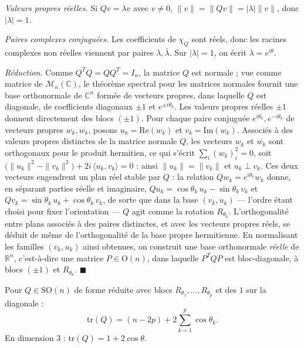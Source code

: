 \begin{mdframed}[style=proofbar]
  \textit{Valeurs propres réelles.} Si $Qv=\lambda v$ avec $v\neq 0$,
  $\|v\|=\|Qv\|=|\lambda|\|v\|$, donc $|\lambda|=1$.

  \textit{Paires complexes conjuguées.} Les coefficients de $\chi_Q$ sont réels,
  donc les racines complexes non réelles viennent par paires $\lambda,\bar\lambda$.
  Sur $|\lambda|=1$, on écrit $\lambda=e^{i\theta}$.

  \textit{Réduction.} Comme $Q^TQ=QQ^T=I_n$, la matrice $Q$ est normale ;
  vue comme matrice de $\mathcal{M}_n(\mathbb{C})$, le théorème spectral pour les
  matrices normales fournit une base orthonormale de $\mathbb{C}^n$ formée de vecteurs
  propres, dans laquelle $Q$ est diagonale, de coefficients diagonaux $\pm 1$ et
  $e^{\pm i\theta_k}$. Les valeurs propres réelles $\pm 1$ donnent directement des
  blocs $(\pm 1)$. Pour chaque paire conjuguée $e^{i\theta_k},e^{-i\theta_k}$ de
  vecteurs propres $w_k,\overline{w_k}$, posons $u_k=\mathrm{Re}(w_k)$ et
  $v_k=\mathrm{Im}(w_k)$. Associés à des valeurs propres distinctes de la matrice
  normale $Q$, les vecteurs $w_k$ et $\overline{w_k}$ sont orthogonaux pour le
  produit hermitien, ce qui s'écrit $\sum_i {(w_k)}_i^2 = 0$, soit
  $\bigl(\|u_k\|^2-\|v_k\|^2\bigr) + 2i\,\langle u_k,v_k\rangle = 0$ : ainsi
  $\|u_k\| = \|v_k\|$ et $u_k \perp v_k$. Ces deux vecteurs engendrent un plan réel
  stable par $Q$ : la relation $Qw_k = e^{i\theta_k}w_k$ donne, en séparant parties
  réelle et imaginaire, $Qu_k = \cos\theta_k\,u_k - \sin\theta_k\,v_k$ et
  $Qv_k = \sin\theta_k\,u_k + \cos\theta_k\,v_k$, de sorte que dans la base
  $(v_k,u_k)$ — l'ordre étant choisi pour fixer l'orientation — $Q$ agit comme la
  rotation $R_{\theta_k}$. L'orthogonalité entre plans associés à des paires
  distinctes, et avec les vecteurs propres réels, se déduit de même de
  l'orthogonalité de la base propre hermitienne. En normalisant les familles
  $(v_k,u_k)$ ainsi obtenues, on construit une base orthonormale \emph{réelle} de
  $\mathbb{R}^n$, c'est-à-dire une matrice $P\in\mathrm{O}(n)$, dans laquelle
  $P^TQP$ est bloc-diagonale, à blocs $(\pm 1)$ et $R_{\theta_k}$. $\blacksquare$
\end{mdframed}

Pour $Q \in \mathrm{SO}(n)$ de forme réduite avec blocs $R_{\theta_1},\ldots,R_{\theta_p}$
et des $1$ sur la diagonale :
\[
  \mathrm{tr}(Q) = (n-2p) + 2\sum_{k=1}^p \cos\theta_k.
\]
En dimension 3 : $\mathrm{tr}(Q) = 1 + 2\cos\theta$.

